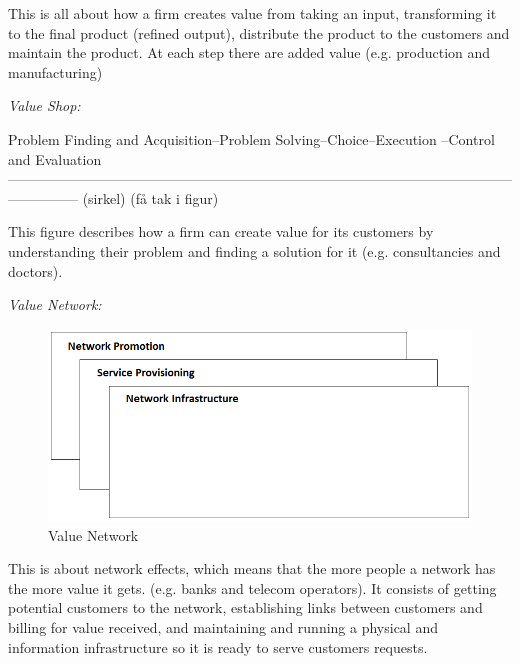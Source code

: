 This is all about how a firm creates value from taking an input, transforming it to the final product (refined output), distribute the product  to the customers and maintain the product. At each step there are added value (e.g. production and manufacturing)

\bigskip

\emph{Value Shop:}

Problem Finding and Acquisition--Problem Solving--Choice--Execution --Control and Evaluation
---------------------------------------------------------------------------------------------------------------------------
(sirkel) (få tak i figur)

This figure describes how a firm can create value for its customers by understanding their problem and finding a solution for it (e.g. consultancies and doctors).

\bigskip

\emph{Value Network:}

\begin{figure}
\caption[ValueNetwork]{Value Network \cite{osterwalderthesis}}
\label{fig:ValueNetwork}
\begin{center}
\includegraphics[scale=0.5]{valuenetwork}
\end{center}
\end{figure}

This is about network effects, which means that the more people a network has the more value it gets. (e.g. banks and telecom operators). It consists of getting potential customers to the network, establishing links between customers and billing for value received, and maintaining and running a physical and information infrastructure so it is ready to serve customers requests. 
\newpage
